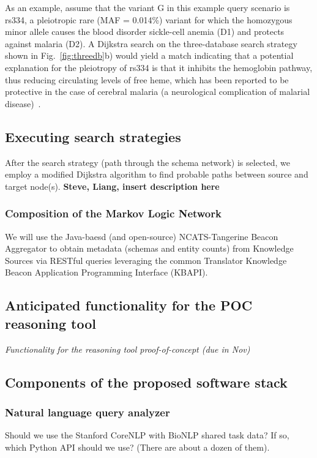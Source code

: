\documentclass[11pt,notitlepage]{article}
\begin{document}
As an example, assume that the variant G in this example query scenario is rs334, a pleiotropic rare (MAF = 0.014\%) variant for which the homozygous minor allele causes the blood disorder sickle-cell anemia (D1) and protects against malaria (D2). A Dijkstra search on the three-database search strategy shown in Fig.~\ref{fig:threedb}b) would yield a match indicating that a potential explanation for the pleiotropy of rs334 is that it inhibits the hemoglobin pathway, thus reducing circulating levels of free heme, which has been reported to be protective in the case of cerebral malaria (a neurological complication of malarial disease)~\cite{Ferreira:2011ff}.

\subsection{Executing search strategies}
After the search strategy (path through the schema network) is selected, we employ a modified Dijkstra algorithm to find probable paths between source and target node(s).
\textbf{Steve, Liang, insert description here}

\subsubsection{Composition of the Markov Logic Network}
We will use the Java-baesd (and open-source) NCATS-Tangerine Beacon Aggregator
to obtain metadata (schemas and entity counts) from Knowledge Sources via
RESTful queries leveraging the common Translator Knowledge Beacon Application
Programming Interface (KBAPI).


\subsection{Anticipated functionality for the POC reasoning tool}
\textit{Functionality for the reasoning tool proof-of-concept (due in Nov)}
\subsection{Components of the proposed software stack}


\subsubsection{Natural language query analyzer}
\label{sec:nlp}
Should we use the Stanford CoreNLP with BioNLP shared task data? If so, which
Python API should we use? (There are about a dozen of them).
\end{document}
